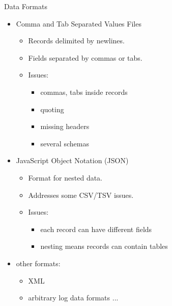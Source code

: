 \documentclass[aspectratio=169]{../latex_main/tntbeamer}  %
\begin{document}
\begin{frame}[c]{Data Formats}
    \begin{itemize}
        \item Comma and Tab Separated Values Files
        \begin{itemize}
            \item Records delimited by newlines.
            \item Fields separated by commas or tabs.
            \item Issues: 
            \begin{itemize}
                \item commas, tabs inside records
                \item quoting
                \item missing headers
                \item several schemas
            \end{itemize}
        \end{itemize}
        \item JavaScript Object Notation (JSON)
        \begin{itemize}
            \item Format for nested data.
            \item Addresses some CSV/TSV issues.
            \item Issues: 
            \begin{itemize}
                \item each record can have different fields
                \item nesting means records can contain tables 
            \end{itemize}
        \end{itemize}
        \item other formats:
        \begin{itemize}
            \item XML
            \item arbitrary log data formats ...
        \end{itemize}
    \end{itemize}
\end{frame}
\end{document}
